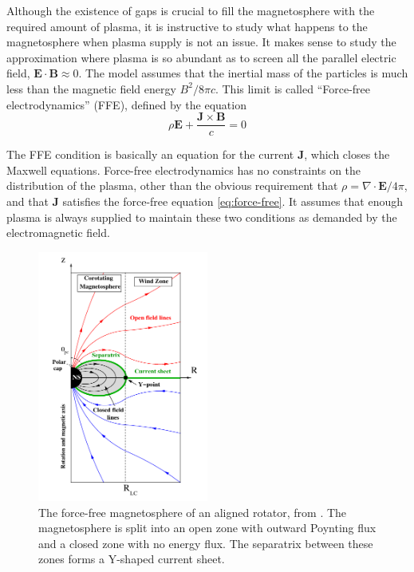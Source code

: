 Although the existence of gaps is crucial to fill the magnetosphere with the
required amount of plasma, it is instructive to study what happens to the
magnetosphere when plasma supply is not an issue. It makes sense to study the
approximation where plasma is so abundant as to screen all the parallel electric
field, $\mathbf{E}\cdot \mathbf{B}\approx 0$. The model assumes that the
inertial mass of the particles is much less than the magnetic field energy
$B^{2}/8\pi c$. This limit is called ``Force-free electrodynamics'' (FFE),
defined by the equation
\begin{equation}
  \label{eq:force-free}
  \rho \mathbf{E} + \frac{\mathbf{J}\times \mathbf{B}}{c} = 0
\end{equation}

The FFE condition is basically an equation for the current $\mathbf{J}$, which
closes the Maxwell equations. Force-free electrodynamics has no constraints on
the distribution of the plasma, other than the obvious requirement that $\rho =
\nabla\cdot \mathbf{E} / 4\pi$, and that $\mathbf{J}$ satisfies the force-free
equation \eqref{eq:force-free}. It assumes that enough plasma is always supplied
to maintain these two conditions as demanded by the electromagnetic field.

\begin{figure}[h]
  \centering
  \includegraphics[width=0.5\textwidth]{pics/intro/force-free.png}
  \caption[The force-free magnetosphere.]{The force-free magnetosphere of an
    aligned rotator, from \citep{cerutti_electrodynamics_2016}. The
    magnetosphere is split into an open zone with outward Poynting flux and a
    closed zone with no energy flux. The separatrix between these zones forms a
    Y-shaped current sheet. }
  \label{fig:force-free}
\end{figure}

